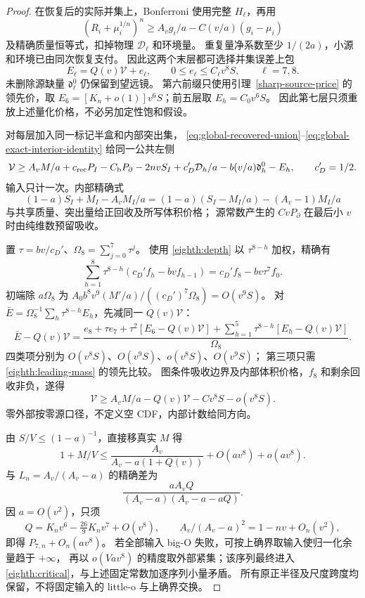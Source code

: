 \begin{proof}
在恢复后的实际并集上，Bonferroni 使用完整 \(H_\ell\)，再用
\[
 (R_i+\mu_i^{1/n})^n\ge A_vg_i/a-C(v/a)(g_i-\mu_i)
\]
及精确质量恒等式，扣掉物理 \(\mathcal D_\ell\) 和环境量。
重复量净系数至少 \(1/(2a)\)，小源和环境已由同次恢复支付。
因此这两个末层都可选择并集误差上包
\begin{equation}\label{eighth:two-prefix-prices}
 E_\ell=Q(v)\mathcal V+e_\ell,\qquad 0\le e_\ell\le C_\ell v^8S,\qquad \ell=7,8.
\end{equation}
未删除源缺量 \(\mathfrak d_\ell^0\) 仍保留到望远镜。
第六前缀只使用引理~\ref{sharp-source-price} 的领先价，取
\(E_6=[K_n+o(1)]v^6S\)；前五层取 \(E_h=C_0v^6S\)。
因此第七层只须重放上述量化价格，不必另加定性饱和假设。

对每层加入同一标记半盒和内部突出集，
\eqref{eq:global-recovered-union}--\eqref{eq:global-exact-interior-identity}
给同一公共左侧
\begin{equation}\label{eighth:ledger}
 \mathcal V\ge A_vM/a+c_{\rm rec}P_I-C_{\rm b}P_\partial-2nvS_I
 +c_D'\mathcal D_h/a-b(v/a)\mathfrak d_h^0-E_h,\qquad c_D'=1/2.
\end{equation}
输入只计一次。内部精确式
\[
 (1-a)S_I+M_I-A_vM_I/a
 =(1-a)(S_I-M_I/a)-(A_v-1)M_I/a
\]
与共享质量、突出量给正回收及所写体积价格；
源常数产生的 \(CvP_\partial\) 在最后小 \(v\) 时由纯维数预留吸收。

置 \(\tau=bv/c_D'\)、\(\Omega_8=\sum_{j=0}^7\tau^j\)。
使用 \eqref{eighth:depth} 以 \(\tau^{8-h}\) 加权，精确有
\begin{equation}\label{eighth:telescope}
 \sum_{h=1}^8\tau^{8-h}(c_D'f_h-bvf_{h-1})
                  =c_D'f_8-bv\tau^7f_0 .
\end{equation}
初端除 \(a\Omega_8\) 为
\(A_0b^8v^9(M'/a)/((c_D')^7\Omega_8)=O(v^9S)\)。
对 \(\bar E=\Omega_8^{-1}\sum_h\tau^{8-h}E_h\)，先减同一 \(Q(v)\mathcal V\)：
\[
 \bar E-Q(v)\mathcal V=
 \frac{e_8+\tau e_7+\tau^2[E_6-Q(v)\mathcal V]
       +\sum_{h=1}^5\tau^{8-h}[E_h-Q(v)\mathcal V]}{\Omega_8}.
\]
四类项分别为 \(O(v^8S)\)、\(O(v^9S)\)、\(o(v^8S)\)、\(O(v^9S)\)；
第三项只需 \eqref{eighth:leading-mass} 的领先比较。
图条件吸收边界及内部体积价格，\(f_8\) 和剩余回收非负，遂得
\[
 \mathcal V\ge A_vM/a-Q(v)\mathcal V-Cv^8S-o(v^8S).
\]
零外部按零源口径，不定义空 CDF，内部计数给同方向。

由 \(S/V\le(1-a)^{-1}\)，直接移真实 \(M\) 得
\[
 1+M/V\le\frac{A_v}{A_v-a(1+Q(v))}+O(av^8)+o(av^8).
\]
与 \(L_n=A_v/(A_v-a)\) 的精确差为
\[
 \frac{aA_vQ}{(A_v-a)(A_v-a-aQ)}.
\]
因 \(a=O(v^2)\)，只须
\[
 Q=K_nv^6-\tfrac{26}{9}K_nv^7+O(v^8),\qquad
 A_v/(A_v-a)^2=1-nv+O_n(v^2),
\]
即得 \(P_{7,n}+O_n(av^8)\)。
若全部输入 big-O 失败，可按上确界取输入使归一化余量趋于 \(+\infty\)，
再以 \(o(Vav^8)\) 的精度取外部紧集；该序列最终进入
\eqref{eighth:critical}，与上述固定常数加逐序列小量矛盾。
所有原正半径及尺度跨度均保留，不将固定输入的 little-o 与上确界交换。
\end{proof}

